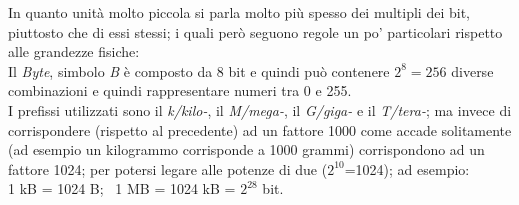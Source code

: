 In quanto unità molto piccola si parla molto più spesso dei multipli dei bit, piuttosto che di essi stessi; i quali però seguono regole un po' particolari rispetto alle grandezze fisiche:\\
Il \textit{Byte}, simbolo \textit{B} è composto da 8 bit e quindi può contenere $2^8 = 256$ diverse combinazioni e quindi rappresentare numeri tra 0 e 255.\\
I prefissi utilizzati sono il \textit{k/kilo-}, il \textit{M/mega-}, il \textit{G/giga-} e il \textit{T/tera-}; ma invece di corrispondere (rispetto al precedente) ad un fattore 1000 come accade solitamente (ad esempio un kilogrammo corrisponde a 1000 grammi) corrispondono ad un fattore 1024; per potersi legare alle potenze di due ($2^{10}$=1024); ad esempio:\\
1 kB = 1024 B; \ 1 MB = 1024 kB = $2^{28}$ bit.
